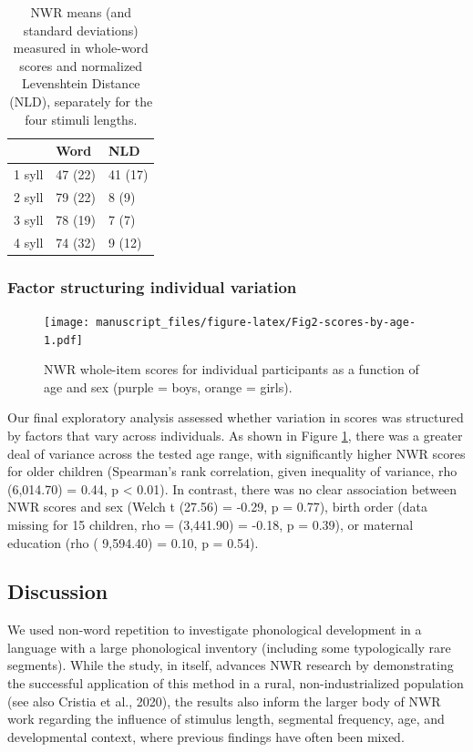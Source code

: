 \documentclass[english,,man,floatsintext]{apa6}
\begin{document}
\begin{table}

\caption{\label{tab:tablength}NWR means (and standard deviations) measured in whole-word scores and normalized Levenshtein Distance (NLD), separately for the four stimuli lengths.}
\centering
\begin{tabular}[t]{lll}
\toprule
  & Word & NLD\\
\midrule
1 syll & 47 (22) & 41 (17)\\
2 syll & 79 (22) & 8 (9)\\
3 syll & 78 (19) & 7 (7)\\
4 syll & 74 (32) & 9 (12)\\
\bottomrule
\end{tabular}
\end{table}

\hypertarget{factor-structuring-individual-variation}{%
\subsubsection{Factor structuring individual variation}\label{factor-structuring-individual-variation}}

\begin{figure}
\centering
\texttt{[image: manuscript\_files/figure-latex/Fig2-scores-by-age-1.pdf]}
\caption{\label{fig:Fig2-scores-by-age}NWR whole-item scores for individual participants as a function of age and sex (purple = boys, orange = girls).}
\end{figure}

Our final exploratory analysis assessed whether variation in scores was structured by factors that vary across individuals. As shown in Figure \ref{fig:Fig2-scores-by-age}, there was a greater deal of variance across the tested age range, with significantly higher NWR scores for older children (Spearman's rank correlation, given inequality of variance, rho (6,014.70) = 0.44, p \textless{} 0.01). In contrast, there was no clear association between NWR scores and sex (Welch t (27.56) = -0.29, p = 0.77), birth order (data missing for 15 children, rho = (3,441.90) = -0.18, p = 0.39), or maternal education (rho ( 9,594.40) = 0.10, p = 0.54).

\hypertarget{discussion}{%
\subsection{Discussion}\label{discussion}}

We used non-word repetition to investigate phonological development in a language with a large phonological inventory (including some typologically rare segments). While the study, in itself, advances NWR research by demonstrating the successful application of this method in a rural, non-industrialized population (see also Cristia et al., 2020), the results also inform the larger body of NWR work regarding the influence of stimulus length, segmental frequency, age, and developmental context, where previous findings have often been mixed.
\end{document}
